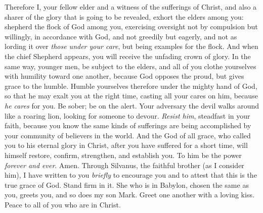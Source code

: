 \begin{biblechapter} %
 Therefore I, your fellow elder and a witness of the sufferings of Christ, and also a sharer of the glory that is going to be revealed, exhort the elders among you:
\verse shepherd the flock of God among you, exercising oversight not by compulsion but willingly, in accordance with God, and not greedily but eagerly,
\verse and not as lording it over \textit{those under your care}, but being examples for the flock.
\verse And when the chief Shepherd appears, you will receive the unfading crown of glory.
\verse In the same way, younger men, be subject to the elders, and all of you clothe yourselves with humility toward one another, because God opposes the proud, but gives grace to the humble.
\verse Humble yourselves therefore under the mighty hand of God, so that he may exalt you at the right time,
\verse casting all your cares on him, because \textit{he cares} for you.
\verse Be sober; be on the alert. Your adversary the devil walks around like a roaring lion, looking for someone to devour.
\verse \textit{Resist him}, steadfast in your faith, because you know the same kinds of sufferings are being accomplished by your community of believers in the world.
\verse And the God of all grace, who called you to his eternal glory in Christ, after you have suffered for a short time, will himself restore, confirm, strengthen, and establish you.
\verse To him be the power \textit{forever and ever}. Amen.
 Through Silvanus, the faithful brother (as I consider him), I have written to you \textit{briefly} to encourage you and to attest that this is the true grace of God. Stand firm in it.
\verse She who is in Babylon, chosen the same as you, greets you, and so does my son Mark.
\verse Greet one another with a loving kiss. Peace to all of you who are in Christ.
\end{biblechapter}

